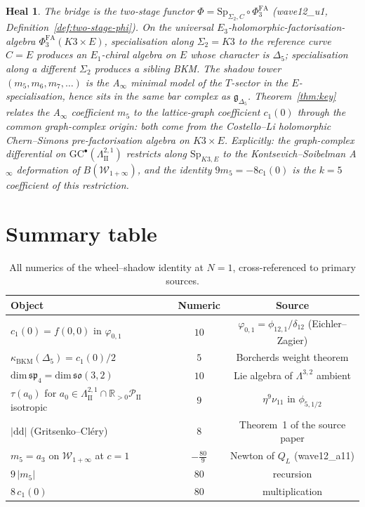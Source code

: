 \documentclass[11pt]{article}
\newtheorem*{heal}{Heal}
\newcommand{\kBKM}{\kappa_{\mathrm{BKM}}}
\newcommand{\Winf}{\mathcal{W}_{1+\infty}}
\newcommand{\LII}{\Lambda^{2,1}_{\mathrm{II}}}
\newcommand{\PII}{\mathcal{P}_{\mathrm{II}}}
\newcommand{\phii}{\varphi_{0,1}}
\newcommand{\Dlt}{\Delta_5}
\begin{document}
\begin{heal}
The bridge is the two-stage functor
$\Phi = \mathrm{Sp}_{\Sigma_2,C}\circ\Phi^{\mathrm{FA}}_3$
(wave12\_u1, Definition~\ref{def:two-stage-phi}). On the universal
$E_3$-holomorphic-factorisation-algebra
$\Phi^{\mathrm{FA}}_3(K3\times E)$, specialisation along
$\Sigma_2=K3$ to the reference curve $C=E$ produces an
$E_1$-chiral algebra on $E$ whose character is $\Dlt$; specialisation
along a different $\Sigma_2$ produces a sibling BKM. The shadow
tower $(m_5,m_6,m_7,\ldots)$ is the A$_\infty$ minimal model of the
$T$-sector in the $E$-specialisation, hence sits in the same bar
complex as $\mathfrak{g}_{\Dlt}$. Theorem~\ref{thm:key} relates the
A$_\infty$ coefficient $m_5$ to the lattice-graph coefficient
$c_1(0)$ through the common graph-complex origin: both come from
the Costello--Li holomorphic Chern--Simons pre-factorisation algebra
on $K3\times E$. Explicitly: the graph-complex differential on
$\mathrm{GC}^\bullet(\LII)$ restricts along $\mathrm{Sp}_{K3,E}$ to
the Kontsevich--Soibelman A$_\infty$ deformation of $B(\Winf)$, and
the identity $9 m_5 = -8 c_1(0)$ is the $k=5$ coefficient of this
restriction.
\end{heal}

\section{Summary table}

\begin{table}[h]\centering
\begin{tabular}{lcc}
\toprule
Object & Numeric & Source\\
\midrule
$c_1(0)=f(0,0)$ in $\phii$ & $10$ & $\phii=\phi_{12,1}/\delta_{12}$ (Eichler--Zagier)\\
$\kBKM(\Dlt)=c_1(0)/2$ & $5$ & Borcherds weight theorem\\
$\mathrm{dim}\,\mathfrak{sp}_4 = \mathrm{dim}\,\mathfrak{so}(3,2)$ & $10$ & Lie algebra of $\Lambda^{3,2}$ ambient\\
$\tau(a_0)$ for $a_0\in\LII\cap\mathbb{R}_{>0}\PII$ isotropic & $9$ & $\eta^9 \nu_{11}$ in $\phi_{5,1/2}$\\
$|\mathrm{dd}|$ (Gritsenko--Cl{\'e}ry) & $8$ & Theorem~1 of the source paper\\
$m_5 = a_3$ on $\Winf$ at $c=1$ & $-\tfrac{80}{9}$ & Newton of $Q_L$ (wave12\_a11)\\
$9\,|m_5|$ & $80$ & recursion\\
$8\,c_1(0)$ & $80$ & multiplication\\
\bottomrule
\end{tabular}
\caption{All numerics of the wheel--shadow identity at $N=1$, cross-referenced
to primary sources.}
\end{table}
\end{document}
